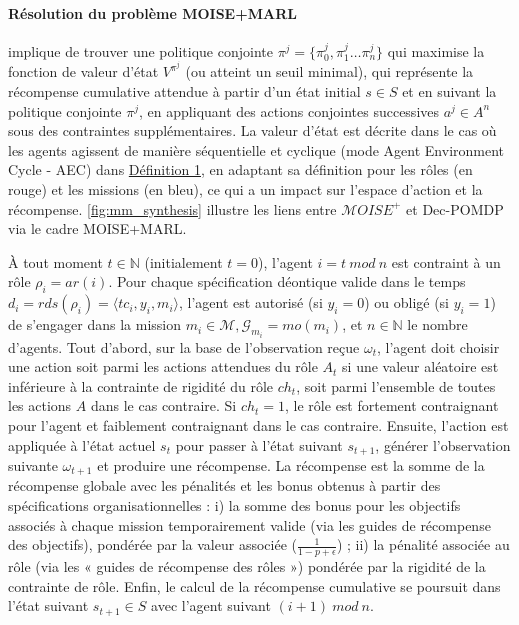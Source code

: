 \paragraph{\textbf{Résolution du problème MOISE+MARL}}
implique de trouver une politique conjointe $\pi^{j} = \{\pi^j_0,\pi^j_1\dots\pi^j_n\}$ qui maximise la fonction de valeur d'état $V^{\pi^{j}}$ (ou atteint un seuil minimal), qui représente la récompense cumulative attendue à partir d'un état initial $s \in S$ et en suivant la politique conjointe $\pi^{j}$, en appliquant des actions conjointes successives $a^{j} \in A^n$ sous des contraintes supplémentaires. La valeur d'état est décrite dans le cas où les agents agissent de manière séquentielle et cyclique (mode Agent Environment Cycle - AEC) dans \hyperref[eq:single_value_function]{Définition 1}, en adaptant sa définition pour les rôles (en rouge) et les missions (en bleu), ce qui a un impact sur l'espace d'action et la récompense. \autoref{fig:mm_synthesis} illustre les liens entre $\mathcal{M}OISE^+$ et Dec-POMDP via le cadre MOISE+MARL.

À tout moment $t \in \mathbb{N}$ (initialement $t = 0$), l'agent $i = t \ mod \ n$ est contraint à un rôle $\rho_i = ar(i)$. Pour chaque spécification déontique valide dans le temps $d_i = rds(\rho_i) = \langle tc_i,y_i, m_i \rangle$, l'agent est autorisé (si $y_i = 0$) ou obligé (si $y_i = 1$) de s'engager dans la mission $m_i \in \mathcal{M}, \mathcal{G}_{m_i} = mo(m_i)$, et $n \in \mathbb{N}$ le nombre d'agents.
%
Tout d'abord, sur la base de l'observation reçue $\omega_t$, l'agent doit choisir une action soit parmi les actions attendues du rôle $A_t$ si une valeur aléatoire est inférieure à la contrainte de rigidité du rôle $ch_t$, soit parmi l'ensemble de toutes les actions $A$ dans le cas contraire. Si $ch_t = 1$, le rôle est fortement contraignant pour l'agent et faiblement contraignant dans le cas contraire.
%
Ensuite, l'action est appliquée à l'état actuel $s_t$ pour passer à l'état suivant $s_{t+1}$, générer l'observation suivante $\omega_{t+1}$ et produire une récompense. La récompense est la somme de la récompense globale avec les pénalités et les bonus obtenus à partir des spécifications organisationnelles : \quad i) la somme des bonus pour les objectifs associés à chaque mission temporairement valide (via les guides de récompense des objectifs), pondérée par la valeur associée ($\frac{1}{1-p+\epsilon}$) ; \quad ii) la pénalité associée au rôle (via les « guides de récompense des rôles ») pondérée par la rigidité de la contrainte de rôle.
%
Enfin, le calcul de la récompense cumulative se poursuit dans l'état suivant $s_{t+1} \in S$ avec l'agent suivant $(i+1) \ mod \ n$.

